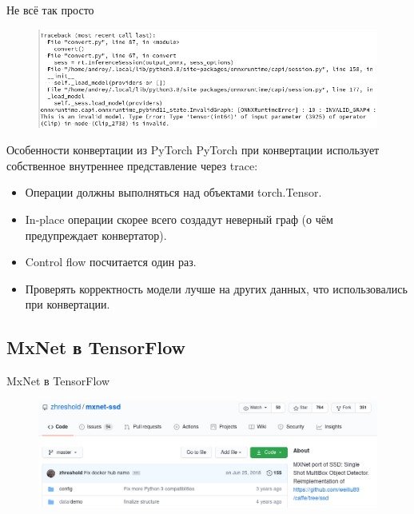\documentclass[mathserif,serif,unicode]{beamer}
\begin{document}
\begin{frame}{Не всё так просто}
\begin{alertblock}{}
\begin{figure}
    \centering
    \includegraphics[width=\textwidth]{images/conv_error.png}
\end{figure}
\end{alertblock}
\end{frame}

\begin{frame}{Особенности конвертации из PyTorch}
PyTorch при конвертации использует собственное внутреннее представление через trace:
    \begin{itemize}
        \item Операции должны выполняться над объектами torch.Tensor.
        \item In-place операции скорее всего создадут неверный граф (о чём предупреждает конвертатор).
        \item Control flow посчитается один раз.
        \item Проверять корректность модели лучше на других данных, что использовались при конвертации.
    \end{itemize}
\end{frame}

\subsection{MxNet в TensorFlow}

\begin{frame}{MxNet в TensorFlow}

\begin{block}{}
    \begin{figure}
        \centering
        \includegraphics[width=\textwidth]{images/mxnet_ssd.png}
    \end{figure}
\end{block}
    
\end{frame}
\end{document}
